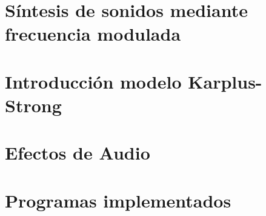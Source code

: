 







\tableofcontents
\newpage


%	
%		
%	
%	
\section{Síntesis de sonidos mediante frecuencia modulada}
	\label{Ejercicio-3}
	

\section{Introducción modelo Karplus-Strong}
	\label{Ejercicio-4}
	
	
\section{Efectos de Audio}
	\label{Ejercicio-6}
	


\section{Programas implementados}
	\label{Ejercicio-8}
	


